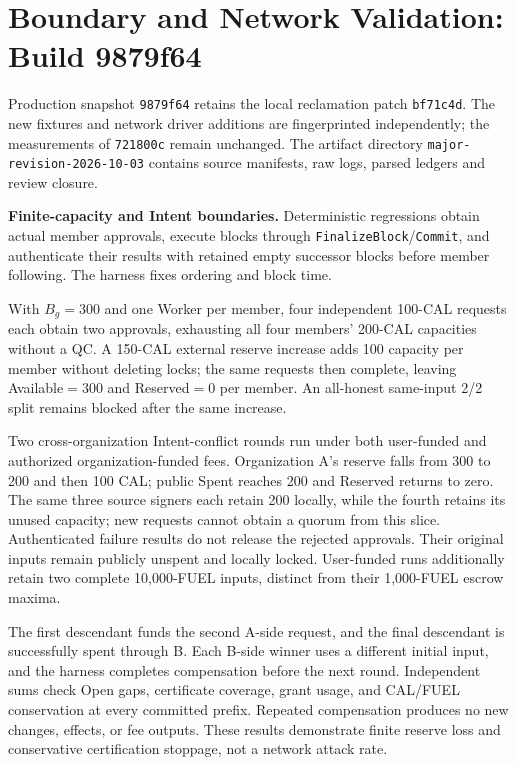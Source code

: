 \section{Boundary and Network Validation: Build 9879f64}
\label{supp:major-revision}
Production snapshot \texttt{9879f64} retains the local reclamation patch
\texttt{bf71c4d}. The new fixtures and network driver additions are
fingerprinted independently; the measurements of \texttt{721800c} remain
unchanged. The artifact directory \texttt{major-revision-2026-10-03}
contains source manifests, raw logs, parsed ledgers and review closure.

\noindent\textbf{Finite-capacity and Intent boundaries.}
Deterministic regressions obtain actual member approvals, execute
blocks through \texttt{FinalizeBlock}/\texttt{Commit}, and authenticate
their results with retained empty successor blocks before member
following. The harness fixes ordering and block time.

With $B_g=300$ and one Worker per member, four independent 100-CAL
requests each obtain two approvals, exhausting all four members'
200-CAL capacities without a QC. A 150-CAL external reserve increase
adds 100 capacity per member without deleting locks; the same requests
then complete, leaving Available$=300$ and Reserved$=0$ per member.
An all-honest same-input 2/2 split remains blocked after the same increase.

Two cross-organization Intent-conflict rounds run under both user-funded
and authorized organization-funded fees. Organization A's reserve falls
from 300 to 200 and then 100 CAL; public Spent reaches 200 and Reserved
returns to zero. The same three source signers each retain 200 locally,
while the fourth retains its unused capacity; new requests cannot obtain
a quorum from this slice. Authenticated failure results do not release
the rejected approvals. Their original inputs remain publicly unspent
and locally locked. User-funded runs additionally retain two complete
10,000-FUEL inputs, distinct from their 1,000-FUEL escrow maxima.

The first descendant funds the second A-side request, and the final
descendant is successfully spent through B. Each B-side winner uses a
different initial input, and the harness completes compensation before
the next round. Independent sums check Open gaps, certificate coverage,
grant usage, and CAL/FUEL conservation at every committed prefix.
Repeated compensation produces no new changes, effects, or fee outputs.
These results demonstrate finite reserve loss and conservative
certification stoppage, not a network attack rate.


